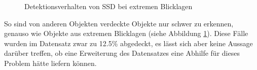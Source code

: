 \begin{figure}[H]
	\centering
	\hspace{2cm}
	\caption{Detektionsverhalten von SSD bei extremen Blicklagen}
	\label{lagen}
\end{figure}

So sind von anderen Objekten verdeckte Objekte nur schwer zu erkennen, genauso wie Objekte aus extremen Blicklagen (siehe Abbildung \ref{lagen}). Diese Fälle wurden im Datensatz zwar zu 12.5\% abgedeckt, es lässt sich aber keine Aussage darüber treffen, ob eine Erweiterung des Datensatzes eine Abhilfe für dieses Problem hätte liefern können. 

